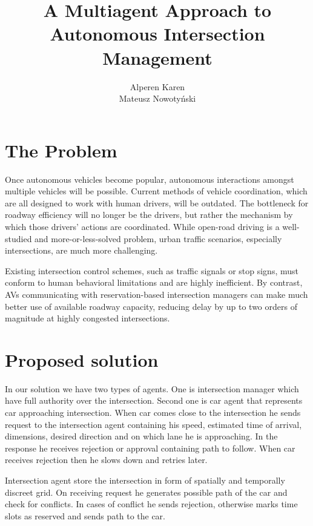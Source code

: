 \documentclass[12pt]{extreport}
\title{A Multiagent Approach to Autonomous Intersection Management}
\author{Alperen Karen\\Mateusz Nowotyński}
\begin{document}
\maketitle

\chapter{The Problem}
Once autonomous vehicles become popular, autonomous interactions amongst multiple vehicles will be possible. Current methods of vehicle coordination, which are all designed to work with human drivers, will be outdated. The bottleneck for roadway efficiency will no longer be the drivers, but rather the mechanism by which those drivers’ actions are coordinated. While open-road driving is a well-studied and more-or-less-solved problem, urban traffic scenarios, especially intersections, are much more challenging.

Existing intersection control schemes, such as traffic signals or stop signs, must conform to human behavioral limitations and are highly inefficient. By contrast, AVs communicating with reservation-based intersection managers can make much better use of available roadway capacity, reducing delay by up to two orders of magnitude at highly congested intersections.

\chapter{Proposed solution}
In our solution we have two types of agents. One is intersection manager which have full authority over the intersection. Second one is car agent that represents car approaching intersection. When car comes close to the intersection he sends request to the intersection agent containing his speed, estimated time of arrival, dimensions, desired direction and on which lane he is approaching. In the response he receives rejection or approval containing path to follow. When car receives rejection then he slows down and retries later.

Intersection agent store the intersection in form of spatially and temporally discreet grid. On receiving request he generates possible path of the car and check for conflicts. In cases of conflict he sends rejection, otherwise marks time slots as reserved and sends path to the car.
\end{document}
